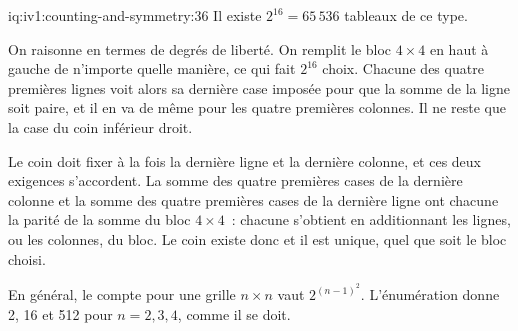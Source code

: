 \begin{solution}{iq:iv1:counting-and-symmetry:36}
Il existe $2^{16} = 65\,536$ tableaux de ce type.

On raisonne en termes de degrés de liberté. On remplit le bloc $4 \times 4$ en haut à gauche de n'importe quelle manière, ce qui fait $2^{16}$ choix. Chacune des quatre premières lignes voit alors sa dernière case imposée pour que la somme de la ligne soit paire, et il en va de même pour les quatre premières colonnes. Il ne reste que la case du coin inférieur droit.

Le coin doit fixer à la fois la dernière ligne et la dernière colonne, et ces deux exigences s'accordent. La somme des quatre premières cases de la dernière colonne et la somme des quatre premières cases de la dernière ligne ont chacune la parité de la somme du bloc $4 \times 4$~: chacune s'obtient en additionnant les lignes, ou les colonnes, du bloc. Le coin existe donc et il est unique, quel que soit le bloc choisi.

En général, le compte pour une grille $n \times n$ vaut $2^{(n-1)^2}$. L'énumération donne 2, 16 et 512 pour $n = 2, 3, 4$, comme il se doit.

\end{solution}


